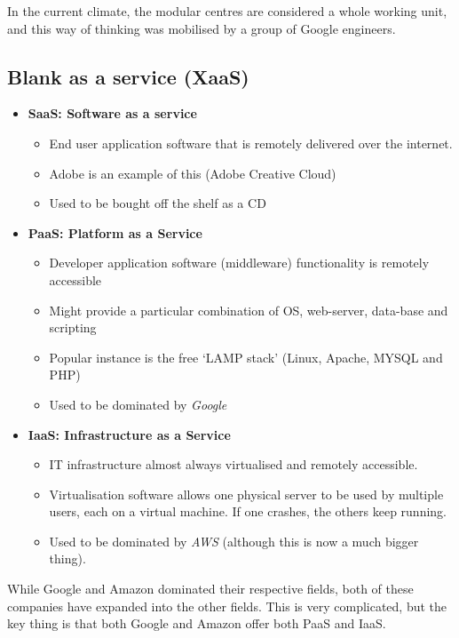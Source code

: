 \documentclass[11pt,a4paper,titlepage,dvipsnames,cmyk]{scrartcl}
\begin{document}
In the current climate, the modular centres are considered a whole working unit, and this way of thinking was mobilised by a group of Google engineers.

\subsection{Blank as a service (XaaS)}
\begin{itemize}
    \item \textbf{SaaS: Software as a service}
    \begin{itemize}
        \item End user application software that is remotely delivered over the internet.
        \item Adobe is an example of this (Adobe Creative Cloud)
        \item Used to be bought off the shelf as a CD
    \end{itemize}
    \item \textbf{PaaS: Platform as a Service}
    \begin{itemize}
        \item Developer application software (middleware) functionality is remotely accessible
        \item Might provide a particular combination of OS, web-server, data-base and scripting
        \item Popular instance is the free `LAMP stack' (Linux, Apache, MYSQL and PHP)
        \item Used to be dominated by \textit{Google}
    \end{itemize}
    \item \textbf{IaaS: Infrastructure as a Service}
    \begin{itemize}
        \item IT infrastructure almost always virtualised and remotely accessible.
        \item Virtualisation software allows one physical server to be used by multiple users, each on a virtual machine. If one crashes, the others keep running.
        \item Used to be dominated by \textit{AWS} (although this is now a much bigger thing).
    \end{itemize}
\end{itemize}

While Google and Amazon dominated their respective fields, both of these companies have expanded into the other fields. This is very complicated, but the key thing is that both Google and Amazon offer both PaaS and IaaS.
\end{document}
